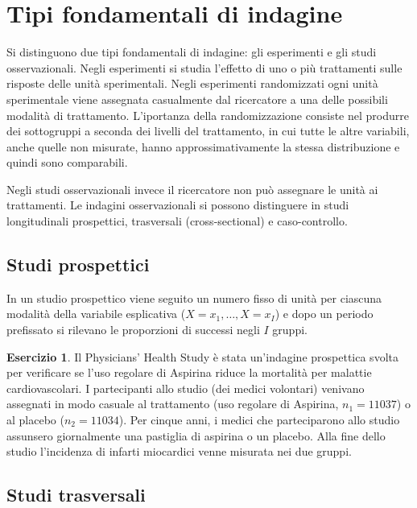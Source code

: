 \documentclass[
  11pt,
]{krantz}
\theoremstyle{definition}
\theoremstyle{definition}
\theoremstyle{definition}
\newtheorem{exercise}{Esercizio}[chapter]
\theoremstyle{definition}
\theoremstyle{remark}
\begin{document}
\hypertarget{tipi-fondamentali-di-indagine}{%
\section{Tipi fondamentali di indagine}\label{tipi-fondamentali-di-indagine}}

Si distinguono due tipi fondamentali di indagine: gli esperimenti e gli studi osservazionali. Negli esperimenti si studia l'effetto di uno o più trattamenti sulle risposte delle unità sperimentali. Negli esperimenti randomizzati ogni unità sperimentale viene assegnata casualmente dal ricercatore a una delle possibili modalità di trattamento. L'iportanza della randomizzazione consiste nel produrre dei sottogruppi a seconda dei livelli del trattamento, in cui tutte le altre variabili, anche quelle non misurate, hanno approssimativamente la stessa distribuzione e quindi sono comparabili.

Negli studi osservazionali invece il ricercatore non può assegnare le unità ai trattamenti. Le indagini osservazionali si possono distinguere in studi longitudinali prospettici, trasversali (cross-sectional) e caso-controllo.

\hypertarget{studi-prospettici}{%
\subsection{Studi prospettici}\label{studi-prospettici}}

In un studio prospettico viene seguito un numero fisso di unità per ciascuna modalità della variabile esplicativa (\(X = x_1, \dots, X = x_I\)) e dopo un periodo prefissato si rilevano le proporzioni di successi negli \(I\) gruppi.

\begin{exercise}
Il Physicians' Health Study è stata un'indagine prospettica svolta per verificare se l'uso regolare di Aspirina riduce la mortalità per malattie cardiovascolari. I partecipanti allo studio (dei medici volontari) venivano assegnati in modo casuale al trattamento (uso regolare di Aspirina, \(n_1=11037\)) o al placebo (\(n_2=11034\)). Per cinque anni, i medici che parteciparono allo studio assunsero giornalmente una pastiglia di aspirina o un placebo. Alla fine dello studio l'incidenza di infarti miocardici venne misurata nei due gruppi.
\end{exercise}

\hypertarget{studi-trasversali}{%
\subsection{Studi trasversali}\label{studi-trasversali}}
\end{document}
